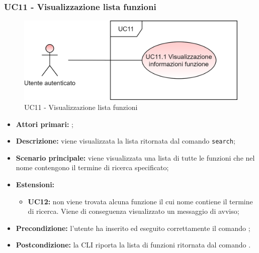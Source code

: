 \subsubsection{UC11 - Visualizzazione lista funzioni}
\begin{figure}[H]
	\centering
	\includegraphics[scale=\ucs]{./res/img/UC11.png}
	\caption {UC11 - Visualizzazione lista funzioni}
\end{figure}
\begin{itemize}
	\item \textbf{Attori primari:} \ua{};
	\item \textbf{Descrizione:} viene visualizzata la lista ritornata dal comando \texttt{search};
	\item \textbf{Scenario principale:} viene visualizzata una lista di tutte le funzioni che nel nome contengono il termine di ricerca specificato;
	\item \textbf{Estensioni:} 
	\begin{itemize}
		\item \textbf{UC12:} non viene trovata alcuna funzione il cui nome contiene il termine di ricerca. Viene di conseguenza visualizzato un messaggio di avviso;
	\end{itemize}
	\item \textbf{Precondizione:} l’utente ha inserito ed eseguito correttamente il comando \search{};
	\item \textbf{Postcondizione:} la CLI riporta la lista di funzioni ritornata dal comando \search{}.
\end{itemize}